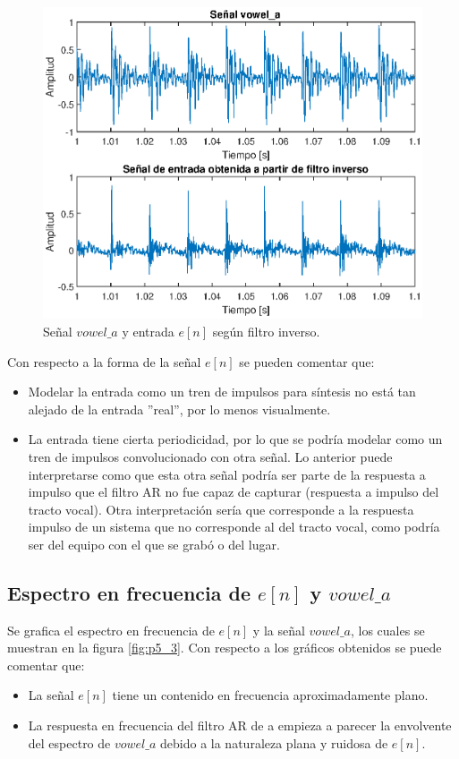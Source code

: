 \begin{figure}[H]
    \centering
    \includegraphics[width = .8\linewidth]{figures/p5_2.eps}
    \caption{Señal $vowel\_a$ y entrada $e[n]$ según filtro inverso.}
    \label{fig:p5_2}
\end{figure}

Con respecto a la forma de la señal $e[n]$ se pueden comentar que:
\begin{itemize}
    \item Modelar la entrada como un tren de impulsos para síntesis no está tan alejado de la entrada ''real'', por lo menos visualmente.
    \item La entrada tiene cierta periodicidad, por lo que se podría modelar como un tren de impulsos convolucionado con otra señal. Lo anterior puede interpretarse como que esta otra señal podría ser parte de la respuesta a impulso que el filtro AR no fue capaz de capturar (respuesta a impulso del tracto vocal). Otra interpretación sería que corresponde a la respuesta impulso de un sistema que no corresponde al del tracto vocal, como podría ser del equipo con el que se grabó o del lugar.
\end{itemize}

\subsection{Espectro en frecuencia de $e[n]$ y $vowel\_a$}

Se grafica el espectro en frecuencia de $e[n]$ y la señal $vowel\_a$, los cuales se muestran en la figura \ref{fig:p5_3}. Con respecto a los gráficos obtenidos se puede comentar que:
\begin{itemize}
    \item La señal $e[n]$ tiene un contenido en frecuencia aproximadamente plano.
    \item La respuesta en frecuencia del filtro AR de a empieza a parecer la envolvente del espectro de $vowel\_a$ debido a la naturaleza plana y ruidosa de $e[n]$. 
\end{itemize}

